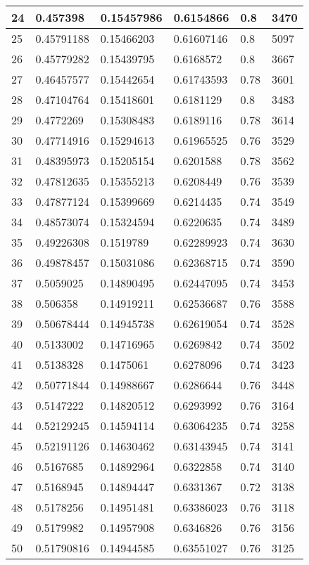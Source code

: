 \begin{longtable}{|l|l|l|l|l|l|}
24 & 0.457398 & 0.15457986 & 0.6154866 & 0.8 & 3470 \\ \hline 
25 & 0.45791188 & 0.15466203 & 0.61607146 & 0.8 & 5097 \\ \hline 
26 & 0.45779282 & 0.15439795 & 0.6168572 & 0.8 & 3667 \\ \hline 
27 & 0.46457577 & 0.15442654 & 0.61743593 & 0.78 & 3601 \\ \hline 
28 & 0.47104764 & 0.15418601 & 0.6181129 & 0.8 & 3483 \\ \hline 
29 & 0.4772269 & 0.15308483 & 0.6189116 & 0.78 & 3614 \\ \hline 
30 & 0.47714916 & 0.15294613 & 0.61965525 & 0.76 & 3529 \\ \hline 
31 & 0.48395973 & 0.15205154 & 0.6201588 & 0.78 & 3562 \\ \hline 
32 & 0.47812635 & 0.15355213 & 0.6208449 & 0.76 & 3539 \\ \hline 
33 & 0.47877124 & 0.15399669 & 0.6214435 & 0.74 & 3549 \\ \hline 
34 & 0.48573074 & 0.15324594 & 0.6220635 & 0.74 & 3489 \\ \hline 
35 & 0.49226308 & 0.1519789 & 0.62289923 & 0.74 & 3630 \\ \hline 
36 & 0.49878457 & 0.15031086 & 0.62368715 & 0.74 & 3590 \\ \hline 
37 & 0.5059025 & 0.14890495 & 0.62447095 & 0.74 & 3453 \\ \hline 
38 & 0.506358 & 0.14919211 & 0.62536687 & 0.76 & 3588 \\ \hline 
39 & 0.50678444 & 0.14945738 & 0.62619054 & 0.74 & 3528 \\ \hline 
40 & 0.5133002 & 0.14716965 & 0.6269842 & 0.74 & 3502 \\ \hline 
41 & 0.5138328 & 0.1475061 & 0.6278096 & 0.74 & 3423 \\ \hline 
42 & 0.50771844 & 0.14988667 & 0.6286644 & 0.76 & 3448 \\ \hline 
43 & 0.5147222 & 0.14820512 & 0.6293992 & 0.76 & 3164 \\ \hline 
44 & 0.52129245 & 0.14594114 & 0.63064235 & 0.74 & 3258 \\ \hline 
45 & 0.52191126 & 0.14630462 & 0.63143945 & 0.74 & 3141 \\ \hline 
46 & 0.5167685 & 0.14892964 & 0.6322858 & 0.74 & 3140 \\ \hline 
47 & 0.5168945 & 0.14894447 & 0.6331367 & 0.72 & 3138 \\ \hline 
48 & 0.5178256 & 0.14951481 & 0.63386023 & 0.76 & 3118 \\ \hline 
49 & 0.5179982 & 0.14957908 & 0.6346826 & 0.76 & 3156 \\ \hline 
50 & 0.51790816 & 0.14944585 & 0.63551027 & 0.76 & 3125 \\ \hline 
\end{longtable}